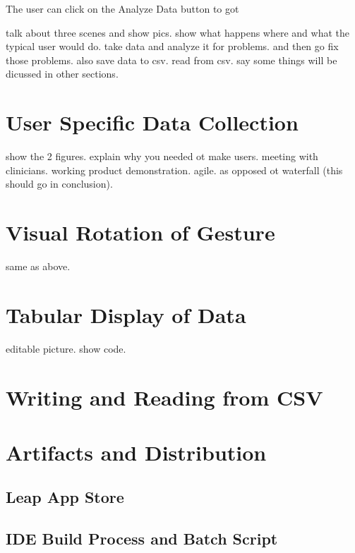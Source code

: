 The user can click on the Analyze Data button to got 


talk about three scenes and show pics. show what happens where and 
what the typical user would do. 
take data and analyze it for problems. 
and then go fix those problems. 
also save data to csv. read from csv. 
say some things will be dicussed in other sections. 


\section{User Specific Data Collection}


show the 2 figures. explain why you needed ot make users. meeting with clinicians. working product demonstration. agile. as opposed ot waterfall (this should go in conclusion). 

 

\section{Visual Rotation of Gesture}

same as above. 

\section{Tabular Display of Data}

editable picture. show code. 
\section{Writing and Reading from CSV}


\section{Artifacts and Distribution}

\subsection{Leap App Store}

\subsection{IDE Build Process and Batch Script}


